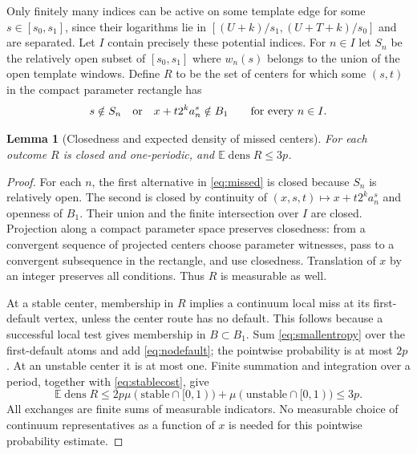 \documentclass[11pt]{article}
\newtheorem{lemma}[theorem]{Lemma}
\theoremstyle{definition}
\theoremstyle{remark}
\newcommand{\dens}{\operatorname{dens}}
\begin{document}
Only finitely many indices can be active on some template edge for some
$s\in[s_0,s_1]$, since their logarithms lie in
$[(U+k)/s_1,(U+T+k)/s_0]$ and are separated. Let $I$ contain precisely these
potential indices. For $n\in I$ let $S_n$ be the relatively open subset of
$[s_0,s_1]$ where $w_n(s)$ belongs to the union of the open template windows.
Define $R$ to be the set of centers for which some $(s,t)$ in the compact
parameter rectangle has
\begin{equation}\label{eq:missed}
 s\notin S_n\quad\hbox{or}\quad x+t2^k a_n^s\notin B_1
 \qquad\text{for every }n\in I.
\end{equation}

\begin{lemma}[Closedness and expected density of missed centers]
\label{lem:closed}
For each outcome $R$ is closed and one-periodic, and
$\mathbb E\dens R\leq3p$.
\end{lemma}
\begin{proof}
For each $n$, the first alternative in \eqref{eq:missed} is closed because
$S_n$ is relatively open. The second is closed by continuity of
$(x,s,t)\mapsto x+t2^ka_n^s$ and openness of $B_1$. Their union and the finite
intersection over $I$ are closed. Projection along a compact parameter space
preserves closedness: from a convergent sequence of projected centers choose
parameter witnesses, pass to a convergent subsequence in the rectangle, and
use closedness. Translation of $x$ by an integer preserves all conditions.
Thus $R$ is measurable as well.

At a stable center, membership in $R$ implies a continuum local miss at its
first-default vertex, unless the center route has no default. This follows
because a successful local test gives membership in $B\subset B_1$.
Sum \eqref{eq:smallentropy} over the first-default atoms and add
\eqref{eq:nodefault}; the pointwise probability is at most $2p$.
At an unstable center it is at most one. Finite summation and integration
over a period, together with \eqref{eq:stablecost}, give
\[
 \mathbb E\dens R
 \leq2p\mu(\text{stable}\cap[0,1))+
       \mu(\text{unstable}\cap[0,1))\leq3p.
\]
All exchanges are finite sums of measurable indicators. No measurable choice
of continuum representatives as a function of $x$ is needed for this
pointwise probability estimate.
\end{proof}
\end{document}
